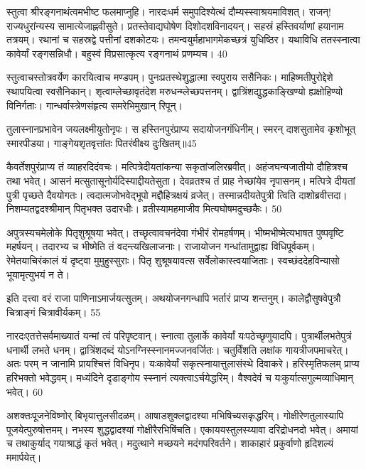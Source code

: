 स्तुत्वा श्रीरङ्गनाथंत्वमभीष्ट फलमाप्नुहि।
नारदःधर्म समुपदिश्येत्थं दौम्यस्स्वाश्रयमाविशत्।
राजन्! राज्यधुरांन्यस्य सामात्येजाह्नवीसुते।
प्रतस्तेवाद्यघोषेण दिशोदशविनादयन्।
सहस्रं हस्तिवर्याणां हयानाम तत्रयम्।
रथानां च सहस्रद्वे पत्तीनां दशकोटयः।
तमन्वयुर्महाभागमेकच्छत्रं युधिष्ठिर।
यथाविधि ततस्स्नात्वा कावेर्यां रङ्गसन्निधौ।
बहुस्वं विप्रसात्कृत्य रङ्गनाथं प्रणम्यच।
40

स्तुत्वाचस्तोत्रवर्येण कारयित्वाच मण्डपम्।
पुनःप्रतस्थेशुद्धात्मा स्वपुराय ससैनिकः।
माहिष्मतीपुरोद्देशे स्थापयित्वा स्वसैनिकान्।
शृत्वाम्लेच्छावृतंदेश मरुधन्म्लेच्छपत्तनम्।
द्वात्रिंशद्युद्धकाङ्खिण्यो ह्यक्षोहिण्यो विनिर्गताः।
गान्धर्वास्त्रेणसंहृत्य समरेभिमुखान् रिपून्।

तुलास्नानप्रभावेन जयलक्ष्मीयुतोनृपः।
स हस्तिनपुरंप्राप्य सदायोजनगंधिनीम्।
स्मरन् दाशसुतामेव कृशोभूत् स्मारपीडया।
गाङ्गेयशृतवृत्तांतः पितरंवीक्ष्य दुःखितम्॥45

कैवर्तेशपुरंप्राप्य तं व्याहरदिदंवचः।
मत्पित्रेदीयतांकन्या सकृतांजलिरब्रवीत्।
अहंजघन्यजातीयो दौहित्रश्च तथा भवेत्।
आसनं मत्सुतासूनोर्यदिस्याद्दीयतेसुता।
देवव्रतश्च तं प्राह नेच्छांयेव नृपासनम्।
मत्पित्रे दीयतां पुत्री पृच्छते दैवयोगतः।
त्वदात्मजोभवेद्भूपो मद्दौहित्रक्षयं व्रजेत्।
तस्मान्नदीयतेपुत्री त्विति दाशोब्रवीत्तदा।
निशम्यतद्वदश्श्रीमान् पितृभक्त उदारधीः।
व्रतीस्यामहमाजीव मित्यघोषमदुच्छकैः।
50

अपुत्रस्यचमेलोके पितृशुश्रूषया भवेत्।
तच्छृत्वावचनंदेवा गंभीरं रोमहर्षणम्।
भीष्मभीष्मेत्यभाषत पुष्पवृष्टि महर्षयन्।
तदारभ्य च भीष्मेति तं वदन्त्यखिलाजनाः।
राजायोजन गन्धांतामुद्वाह्य विधिपूर्वकम्।
रेमेतयाचिरंकालं यं दृष्ट्वा मुमुहुस्सुराः।
पितृ शुश्रूषयावत्स सर्वेलोकास्त्वयाजिताः।
स्वच्छंददेहविन्यासो भूयामृत्युभयं न ते।

इति दत्त्वा वरं राजा पाणिनाऽमार्जयत्सुतम्।
अथयोजनगन्धापि भर्तारं प्राप्य शन्तनुम्।
कालेद्वौसुषवेपुत्रौ चित्राङ्गं चित्रावीर्यकम्।
55

नारदःएतत्तेसर्वमाख्यातं यन्मां त्वं परिपृष्टवान्।
स्नात्वा तुलार्के कावेर्यां यःपठेच्छृणुयादपि।
पुत्रार्थीलभतेपुत्रं धनार्थी लभते धनम्।
द्वात्रिंशदब्दं योऽनग्निस्स्नानमज्जनवर्जितः।
चतुर्विंशति लक्षांक गायत्रीजपमाचरेत्।
अतः परम् न जानामि प्रायश्चित्तं विधिनृप।
यःकावेर्यां सकृत्स्नायात्तुलासंस्थे दिवाकरे।
हरिस्मृतिफलम् प्राप्य हरिभक्तो भवेद्धवम्।
मध्यंदिने दृडाङ्गोय स्स्नानं त्यक्त्वाऽर्चयेद्धरिम्।
वैश्वदेवं च यःकुर्यात्सगुल्मव्याधिमान् भवेत्।
60

अशक्तःपूजनेविष्णोर् बिभृयात्तुलसीदळम्।
आषाडशुक्लद्वादश्या मभिषिच्यसकृद्धरिम्।
गोक्षीरेणतुलास्यापि पूजयेत्पुरुषोत्तमम्।
नभस्य शुद्धद्वादश्यां गोक्षीरैरभिषिंचति।
एकाययस्तुलस्य्यावा दरिद्रोधनदो भवेत्।
अमायां च तथाकुर्याद् गयाश्राद्धं कृतं भवेत्।
मदुत्थाने मच्छयने मदंगपरिवर्तने।
शाकाहारं प्रकुर्वाणो हृदिशल्यं ममार्पयेत्।

